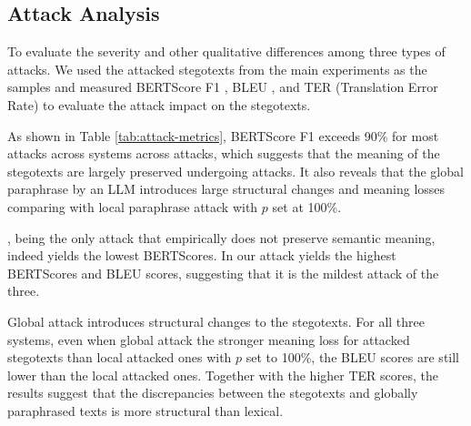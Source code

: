\subsection{Attack Analysis}
\label{app:subsec:attack-analysis}
To evaluate the severity and other qualitative differences among three types of attacks. We used the attacked stegotexts from the main experiments as the samples and measured BERTScore F1 \cite{zhang2020bertscore}, BLEU \cite {papineni-etal-2002-bleu}, and TER (Translation Error Rate) to evaluate the attack impact on the stegotexts.

As shown in Table \ref{tab:attack-metrics}, BERTScore F1 exceeds 90\% for most attacks across systems across attacks, which suggests that the meaning of the stegotexts are largely preserved undergoing attacks. It also reveals that the global paraphrase by an LLM introduces large structural changes and meaning losses comparing with local paraphrase attack with $p$ set at 100\%. 

\syn, being the only attack that empirically does not preserve semantic meaning, indeed yields the lowest BERTScores. In our  \rtt attack yields the highest BERTScores and BLEU scores, suggesting that it is the mildest attack of the three.

Global \llmp attack introduces structural changes to the stegotexts. For all three systems, even when global \llmp attack the stronger meaning loss for attacked stegotexts than local \llmp attacked ones with $p$ set to 100\%, the BLEU scores are still lower than the local \llmp attacked ones. Together with the higher TER scores, the results suggest that the discrepancies between the stegotexts and globally paraphrased texts is more structural than lexical.


